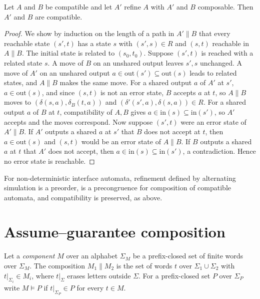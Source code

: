 \begin{newresult}\label{thm:refinement}
Let $A$ and $B$ be compatible and let $A'$ refine $A$ with $A'$ and $B$ composable. Then $A'$ and $B$ are compatible.
\end{newresult}
\begin{proof}
We show by induction on the length of a path in $A'\|B$ that every reachable state $(s',t)$ has a state $s$ with $(s',s)\in R$ and $(s,t)$ reachable in $A\|B$. The initial state is related to $(s_0,t_0)$. Suppose $(s',t)$ is reached with a related state $s$. A move of $B$ on an unshared output leaves $s',s$ unchanged. A move of $A'$ on an unshared output $a\in\mathrm{out}(s')\subseteq\mathrm{out}(s)$ leads to related states, and $A\|B$ makes the same move. For a shared output $a$ of $A'$ at $s'$, $a\in\mathrm{out}(s)$, and since $(s,t)$ is not an error state, $B$ accepts $a$ at $t$, so $A\|B$ moves to $(\delta(s,a),\delta_B(t,a))$ and $(\delta'(s',a),\delta(s,a))\in R$. For a shared output $a$ of $B$ at $t$, compatibility of $A,B$ gives $a\in\mathrm{in}(s)\subseteq\mathrm{in}(s')$, so $A'$ accepts and the moves correspond. Now suppose $(s',t)$ were an error state of $A'\|B$. If $A'$ outputs a shared $a$ at $s'$ that $B$ does not accept at $t$, then $a\in\mathrm{out}(s)$ and $(s,t)$ would be an error state of $A\|B$. If $B$ outputs a shared $a$ at $t$ that $A'$ does not accept, then $a\in\mathrm{in}(s)\subseteq\mathrm{in}(s')$, a contradiction. Hence no error state is reachable.
\end{proof}

\begin{established}
For non-deterministic interface automata, refinement defined by alternating simulation is a preorder, is a precongruence for composition of compatible automata, and compatibility is preserved, as above.
\end{established}

\section{Assume--guarantee composition}

Let a \emph{component} $M$ over an alphabet $\Sigma_M$ be a prefix-closed set of finite words over $\Sigma_M$. The composition $M_1\|M_2$ is the set of words $t$ over $\Sigma_1\cup\Sigma_2$ with $t|_{\Sigma_i}\in M_i$, where $t|_{\Sigma}$ erases letters outside $\Sigma$. For a prefix-closed set $P$ over $\Sigma_P$ write $M\models P$ if $t|_{\Sigma_P}\in P$ for every $t\in M$.

